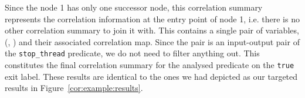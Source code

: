 \documentclass[11pt]{article}
\newcommand{\disp}[1]{\lstinline&#1&}
\begin{document}
\begin{center}
\end{center}

Since the node 1 has only one successor node, this correlation summary represents
the correlation information at the entry point of node 1, i.e. there is no other
correlation summary to join it with. This contains a single pair of variables,
(, ) and their associated correlation map. Since the pair is
an input-output pair of the \disp{stop_thread} predicate, we do not need to 
filter anything out. This constitutes the final correlation summary for the
analysed predicate on the \disp{true} exit label. These results are identical to 
the ones we had depicted as our targeted results in Figure~\ref{cor:example:results}. 
\end{document}
